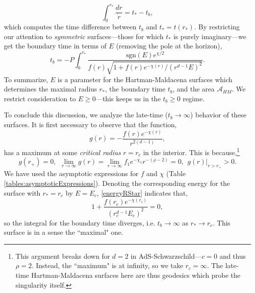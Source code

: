 \documentclass[12pt,a4paper]{article}
\begin{document}
\begin{equation}
\int_0^{r_*} \frac{dr}{\dot{r}} = t_* - t_b,
\end{equation}
which computes the time difference between $t_b$ and $t_* = t(r_*)$. By restricting our attention to \textit{symmetric} surfaces---those for which $t_*$ is purely imaginary---we get the boundary time in terms of $E$ \cite{Frenkel:2020ysx} (removing the pole at the horizon),
\begin{equation}
t_b = -P\int_0^{r_*} \frac{\text{sgn}(E) e^{\chi/2}}{f(r)\sqrt{1 + f(r)e^{-\chi(r)}/(r^{d-1}E)^2}}.
\end{equation}
To summarize, $E$ is a parameter for the Hartman-Maldacena surfaces which determines the maximal radius $r_*$, the boundary time $t_b$, and the area $\mathcal{A}_{HM}$. We restrict consideration to $E \geq 0$---this keeps us in the $t_b \geq 0$ regime.

To conclude this discussion, we analyze the late-time ($t_b \to \infty$) behavior of these surfaces. It is first necessary to observe that the function,
\begin{equation}
g(r) = -\frac{f(r)e^{-\chi(r)}}{r^{2(d-1)}},
\end{equation}
has a maximum at some \textit{critical radius} $r = r_c$ in the interior. This is because,\footnote{This argument breaks down for $d = 2$ in AdS-Schwarzschild---$c = 0$ and thus $\rho = 2$. Instead, the ``maximum" is at infinity, so we take $r_c = \infty$. The late-time Hartman-Maldacena surfaces here are thus geodesics which probe the singularity itself.}
\begin{equation}
g(r_+) = 0,\ \ \lim_{r \to \infty} g(r) = \lim_{r \to \infty} f_1 e^{-\chi_1} r^{-(\rho - 2)} = 0,\ \ g(r)|_{r > r_+} > 0.
\end{equation}
We have used the asymptotic expressions for $f$ and $\chi$ (Table \ref{tables:asymptoticExpressions}). Denoting the corresponding energy for the surface with $r_* = r_c$ by $E = E_c$, \eqref{energyRStar} indicates that,
\begin{equation}
1 + \frac{f(r_c)e^{-\chi(r_c)}}{(r_c^{d-1}E_c)^2} = 0,
\end{equation}
so the integral for the boundary time diverges, i.e. $t_b \to \infty$ as $r_* \to r_c$. This surface is in a sense the ``maximal" one.
\end{document}
